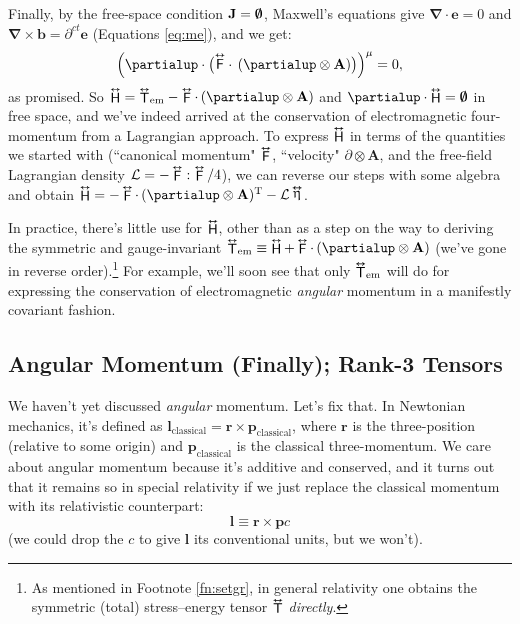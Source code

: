 \documentclass[12pt]{article}
\renewcommand{\vv}[1]{\mathbf{#1}}
\newcommand{\del}{\boldsymbol{\nabla}}
\newcommand{\tightoverset}[2]{%
  \mathop{#2}\limits^{\vbox to -.5ex{\kern-0.75ex\hbox{$#1$}\vss}}}
\newcommand{\inlinedy}[1]{\tightoverset{\text{\tiny$\bm\leftrightarrow$}}{#1}}
\newcommand{\capdy}[1]{ \overset{ \text{\tiny$\bm\leftrightarrow$} }{\vphantom{\text{\small{A}}}\smash{#1}} }
\begin{document}
Finally, by the free-space condition $\vv J = \textrm{\mbox{\boldmath $\emptyset$}}$, Maxwell's equations give $\del \cdot \vv e = 0$ and $\del \times \vv b = \partial^{ct} \vv e$ (Equations \ref{eq:me}), and we get:
\begin{equation*}
\Big( \partialup \cdot \big( \capdy{\mathsf{F}} \cdot \, ( \partialup \otimes \vv A ) \big) \Big)^{\mu} = 0 ,
\end{equation*}
as promised. So $\inlinedy{\mathsf{H}} = {\inlinedy{\mathsf{T}}}_{\textrm{em}} - \inlinedy{\mathsf{F}} \cdot \, ( \partialup \otimes \vv A )$ and $\partialup \cdot \inlinedy{\mathsf{H}} = \textrm{\mbox{\boldmath $\emptyset$}}$ in free space, and we've indeed arrived at the conservation of electromagnetic four-momentum from a Lagrangian approach. To express $\inlinedy{\mathsf{H}}$ in terms of the quantities we started with (``canonical momentum" $\inlinedy{\mathsf{F}}$, ``velocity" $ \partialup \otimes \vv A $, and the free-field Lagrangian density $\mathcal{L} = - \inlinedy{\mathsf{F}} : \inlinedy{\mathsf{F}} / 4$), we can reverse our steps with some algebra and obtain $\inlinedy{\mathsf{H}} = - \inlinedy{\mathsf{F}} \cdot \, ( \partialup \otimes \vv A) {}^{\mathrm{T}} - \mathcal{L} \inlinedy{\upeta}$.

In practice, there's little use for $\inlinedy{\mathsf{H}}$, other than as a step on the way to deriving the symmetric and gauge-invariant ${{\inlinedy{\mathsf{T}}}_{\textrm{em}} \equiv \inlinedy{\mathsf{H}} +  \inlinedy{\mathsf{F}} \cdot \, ( \partialup \otimes \vv A )}$ (we've gone in reverse order).\footnote{As mentioned in Footnote \ref{fn:setgr}, in general relativity one obtains the symmetric (total) stress--energy tensor $\inlinedy{\mathsf{T}}$ \emph{directly}.} For example, we'll soon see that only ${\inlinedy{\mathsf{T}}}_{\textrm{em}}$ will do for expressing the conservation of electromagnetic \emph{angular} momentum in a manifestly covariant fashion.

\subsection{Angular Momentum (Finally); Rank-3 Tensors}

We haven't yet discussed \emph{angular} momentum. Let's fix that. In Newtonian mechanics, it's defined as $\vv l_{\mathrm{classical}} = \vv r \times \vv p_{\mathrm{classical}}$, where $\vv r$ is the three-position (relative to some origin) and $\vv p_{\mathrm{classical}}$ is the classical three-momentum. We care about angular momentum because it's additive and conserved, and it turns out that it remains so in special relativity if we just replace the classical momentum with its relativistic counterpart:
\begin{equation*}
\vv l \equiv \vv r \times \vv p c
\end{equation*}
(we could drop the $c$ to give $\vv l$ its conventional units, but we won't).
\end{document}
